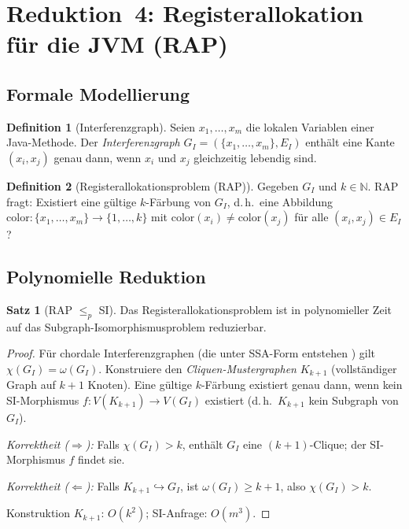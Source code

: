﻿\documentclass[a4paper,12pt]{article}
\theoremstyle{definition}
\newtheorem{definition}{Definition}
\newtheorem{satz}{Satz}
\begin{document}
\section{Reduktion~4: Registerallokation f\"ur die JVM (RAP)}
\label{sec:rap}

\subsection{Formale Modellierung}

\begin{definition}[Interferenzgraph]
Seien $x_1, \ldots, x_m$ die lokalen Variablen einer Java-Methode.
Der \emph{Interferenzgraph} $G_I = (\{x_1, \ldots, x_m\}, E_I)$
enth\"alt eine Kante $(x_i, x_j)$ genau dann, wenn $x_i$ und $x_j$
gleichzeitig lebendig sind.
\end{definition}

\begin{definition}[Registerallokationsproblem (RAP)]
Gegeben $G_I$ und $k \in \mathbb{N}$.  \textsc{RAP} fragt: Existiert
eine g\"ultige $k$-F\"arbung von $G_I$, d.\,h.\ eine Abbildung
$\mathrm{color}\colon \{x_1,\ldots,x_m\} \to \{1,\ldots,k\}$
mit $\mathrm{color}(x_i) \neq \mathrm{color}(x_j)$ f\"ur alle
$(x_i, x_j) \in E_I$?
\end{definition}

\subsection{Polynomielle Reduktion}

\begin{satz}[RAP $\leq_p$ SI]
\label{satz:rap}
Das Registerallokationsproblem ist in polynomieller Zeit auf das
Subgraph-Isomorphismusproblem reduzierbar.
\end{satz}

\begin{proof}
F\"ur chordale Interferenzgraphen (die unter SSA-Form entstehen
\cite{hack2007}) gilt $\chi(G_I) = \omega(G_I)$.  Konstruiere den
\emph{Cliquen-Mustergraphen} $K_{k+1}$ (vollst\"andiger Graph auf
$k{+}1$ Knoten).  Eine g\"ultige $k$-F\"arbung existiert genau dann,
wenn kein SI-Morphismus
$f\colon V(K_{k+1}) \to V(G_I)$ existiert (d.\,h.\ $K_{k+1}$
kein Subgraph von $G_I$).

\emph{Korrektheit ($\Rightarrow$):} Falls $\chi(G_I) > k$,
enth\"alt $G_I$ eine $(k{+}1)$-Clique; der SI-Morphismus $f$
findet sie.

\emph{Korrektheit ($\Leftarrow$):} Falls $K_{k+1} \hookrightarrow
G_I$, ist $\omega(G_I) \geq k{+}1$, also $\chi(G_I) > k$.

Konstruktion $K_{k+1}$: $O(k^2)$; SI-Anfrage: $O(m^3)$.
\end{proof}
\end{document}
